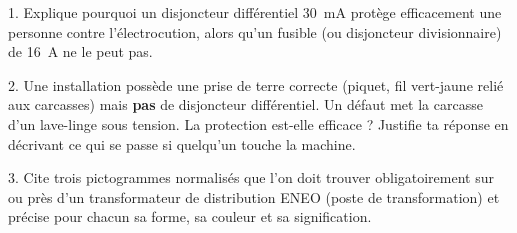 \documentclass[11pt]{article}
\begin{document}
\begin{exercice}
1. Explique pourquoi un disjoncteur différentiel \SI{30}{mA} protège efficacement une personne contre l'électrocution, alors qu'un fusible (ou disjoncteur divisionnaire) de \SI{16}{A} ne le peut pas.\par
2. Une installation possède une prise de terre correcte (piquet, fil vert-jaune relié aux carcasses) mais \textbf{pas} de disjoncteur différentiel. Un défaut met la carcasse d'un lave-linge sous tension. La protection est-elle efficace ? Justifie ta réponse en décrivant ce qui se passe si quelqu'un touche la machine.\par
3. Cite trois pictogrammes normalisés que l'on doit trouver obligatoirement sur ou près d'un transformateur de distribution ENEO (poste de transformation) et précise pour chacun sa forme, sa couleur et sa signification.
\end{exercice}
\end{document}
